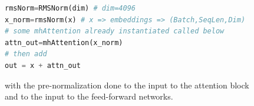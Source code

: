 \documentclass[12pt]{article}
\begin{document}
\begin{figure}[!htb]
\begin{minipage}[t]{0.65\textwidth}
\begin{lstlisting}[language=python,style=python,basicstyle=\ttfamily\footnotesize]
rmsNorm=RMSNorm(dim) # dim=4096
x_norm=rmsNorm(x) # x => embeddings => (Batch,SeqLen,Dim)
# some mhAttention already instantiated called below 
attn_out=mhAttention(x_norm)
# then add 
out = x + attn_out
\end{lstlisting}
with the pre-normalization done to the input to the attention block and 
to the input to the  feed-forward networks. 
\end{minipage}%
\hspace{25pt}
\begin{minipage}[t]{.4\textwidth}
  \raggedright
  \scriptsize 
\end{minipage}
\end{figure}
\pagebreak
\end{document}
